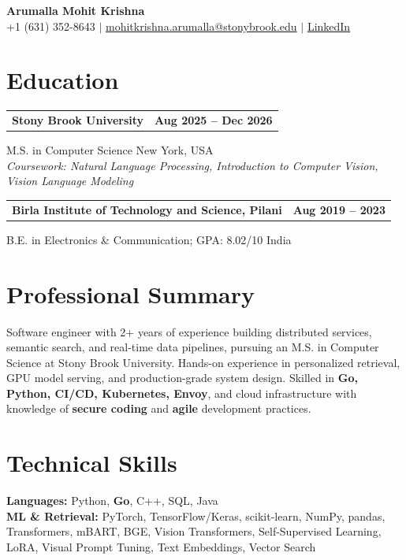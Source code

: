 \documentclass[letterpaper,10pt]{article}
\makeatletter
\newcommand{\entry}[2]{%
  \noindent
  \begin{tabularx}{\linewidth}
    {@{}>{\raggedright\arraybackslash}X@{\hspace{6pt}}r@{}}
    \textbf{#1} & #2
  \end{tabularx}\par
}
\makeatother
\begin{document}
\begin{center}
    {\LARGE\bfseries Arumalla Mohit Krishna}\\[3pt]
    +1 (631) 352-8643 $|$
    \href{mailto:mohitkrishna.arumalla@stonybrook.edu}
    {mohitkrishna.arumalla@stonybrook.edu} $|$
    \href{https://linkedin.com/in/mohit-krishna-arumalla}
    {LinkedIn}
\end{center}
\vspace{-8pt}

\section{Education}

\entry
  {Stony Brook University}
  {\textbf{Aug 2025 -- Dec 2026}}

M.S. in Computer Science \hfill New York, USA\\
\textit{
Coursework: Natural Language Processing,
Introduction to Computer Vision, Vision Language Modeling
}
\vspace{3pt}

\entry
  {Birla Institute of Technology and Science, Pilani}
  {\textbf{Aug 2019 -- 2023}}

B.E. in Electronics \& Communication; GPA: 8.02/10 \hfill India
\section{Professional Summary}

Software engineer with 2+ years of experience building distributed services, semantic search, and real-time data pipelines, pursuing an M.S. in Computer Science at Stony Brook University. Hands-on experience in personalized retrieval, GPU model serving, and production-grade system design. Skilled in \textbf{Go, Python, CI/CD, Kubernetes, Envoy}, and cloud infrastructure with knowledge of \textbf{secure coding} and \textbf{agile} development practices.

\section{Technical Skills}

\textbf{Languages:}
Python, \textbf{Go}, C++, SQL, Java\\

\textbf{ML \& Retrieval:}
PyTorch, TensorFlow/Keras, scikit-learn, NumPy, pandas,
Transformers, mBART, BGE, Vision Transformers,
Self-Supervised Learning, LoRA, Visual Prompt Tuning,
Text Embeddings, Vector Search\\
\end{document}
